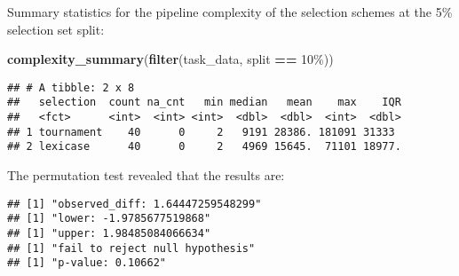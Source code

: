 \documentclass[
]{book}
\newenvironment{Shaded}{\begin{snugshade}}{\end{snugshade}}
\newcommand{\AttributeTok}[1]{\textcolor[rgb]{0.13,0.29,0.53}{#1}}
\newcommand{\DecValTok}[1]{\textcolor[rgb]{0.00,0.00,0.81}{#1}}
\newcommand{\FunctionTok}[1]{\textcolor[rgb]{0.13,0.29,0.53}{\textbf{#1}}}
\newcommand{\NormalTok}[1]{#1}
\newcommand{\OtherTok}[1]{\textcolor[rgb]{0.56,0.35,0.01}{#1}}
\newcommand{\SpecialCharTok}[1]{\textcolor[rgb]{0.81,0.36,0.00}{\textbf{#1}}}
\newcommand{\StringTok}[1]{\textcolor[rgb]{0.31,0.60,0.02}{#1}}
\begin{document}
Summary statistics for the pipeline complexity of the selection schemes at the 5\% selection set split:

\begin{Shaded}
\begin{Highlighting}[]
\FunctionTok{complexity\_summary}\NormalTok{(}\FunctionTok{filter}\NormalTok{(task\_data, split }\SpecialCharTok{==} \StringTok{\textquotesingle{}10\%\textquotesingle{}}\NormalTok{))}
\end{Highlighting}
\end{Shaded}

\begin{verbatim}
## # A tibble: 2 x 8
##   selection  count na_cnt   min median   mean    max    IQR
##   <fct>      <int>  <int> <int>  <dbl>  <dbl>  <int>  <dbl>
## 1 tournament    40      0     2   9191 28386. 181091 31333 
## 2 lexicase      40      0     2   4969 15645.  71101 18977.
\end{verbatim}

The permutation test revealed that the results are:

\begin{Shaded}
\end{Shaded}

\begin{verbatim}
## [1] "observed_diff: 1.64447259548299"
## [1] "lower: -1.9785677519868"
## [1] "upper: 1.98485084066634"
## [1] "fail to reject null hypothesis"
## [1] "p-value: 0.10662"
\end{verbatim}
\end{document}

